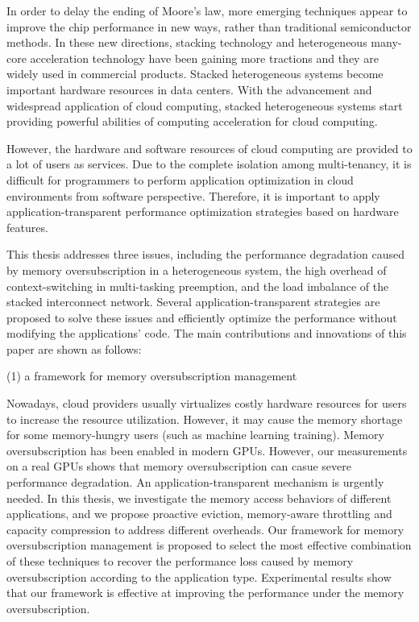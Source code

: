 
\begin{eabstract}
In order to delay the ending of Moore's law, more emerging techniques appear to improve the chip performance in new ways, rather than traditional semiconductor methods.
In these new directions, stacking technology and heterogeneous many-core acceleration technology have been gaining more tractions and they are widely used in commercial products.
Stacked heterogeneous systems become important hardware resources in data centers. 
With the advancement and widespread application of cloud computing, stacked heterogeneous systems start providing powerful abilities of computing acceleration for cloud computing.

However, the hardware and software resources of cloud computing are provided to a lot of users as services.
Due to the complete isolation among multi-tenancy, it is difficult for programmers to perform application optimization in cloud environments from software perspective.
Therefore, it is important to apply application-transparent performance optimization strategies based on hardware features.

This thesis addresses three issues, including the performance degradation caused by memory oversubscription in a heterogeneous system, the high overhead of context-switching in multi-tasking preemption, and the load imbalance of the stacked interconnect network.
Several application-transparent strategies are proposed to solve these issues and efficiently optimize the performance without modifying the applications' code.
The main contributions and innovations of this paper are shown as follows:

(1) a framework for memory oversubscription management

Nowadays, cloud providers usually virtualizes costly hardware resources for users to increase the resource utilization.
However, it may cause the memory shortage for some memory-hungry users (such as machine learning training).
Memory oversubscription has been enabled in modern GPUs.
However, our measurements on a real GPUs shows that memory oversubscription can casue severe performance degradation.
An application-transparent mechanism is urgently needed.
In this thesis, we investigate the memory access behaviors of different applications, 
and we propose proactive eviction, memory-aware throttling and capacity compression to address different overheads.
Our framework for memory oversubscription management is proposed to select the most effective combination of these techniques to recover the performance loss caused by memory oversubscription according to the application type. 
Experimental results show that our framework is effective at improving the performance under the memory oversubscription. 


\end{eabstract}
